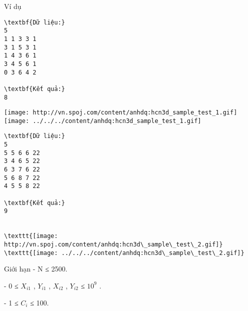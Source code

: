 Ví dụ
\begin{verbatim}
\textbf{Dữ liệu:}
5
1 1 3 3 1
3 1 5 3 1
1 4 3 6 1
3 4 5 6 1
0 3 6 4 2

\textbf{Kết quả:}
8
\end{verbatim}


\texttt{[image: http://vn.spoj.com/content/anhdq:hcn3d\_sample\_test\_1.gif]}
\texttt{[image: ../../../content/anhdq:hcn3d\_sample\_test\_1.gif]}
\begin{verbatim}
\textbf{Dữ liệu:}
5
5 5 6 6 22
3 4 6 5 22
6 3 7 6 22
5 6 8 7 22
4 5 5 8 22

\textbf{Kết quả:}
9


\texttt{[image: http://vn.spoj.com/content/anhdq:hcn3d\_sample\_test\_2.gif]}
\texttt{[image: ../../../content/anhdq:hcn3d\_sample\_test\_2.gif]}\end{verbatim}
Giới hạn
- N ≤ 2500.


- 0 ≤ $X_{i1}$ , $Y_{i1}$ , $X_{i2}$ , $Y_{i2}$ ≤ $10^{9}$ .


- 1 ≤ $C_{i}$ ≤ 100.